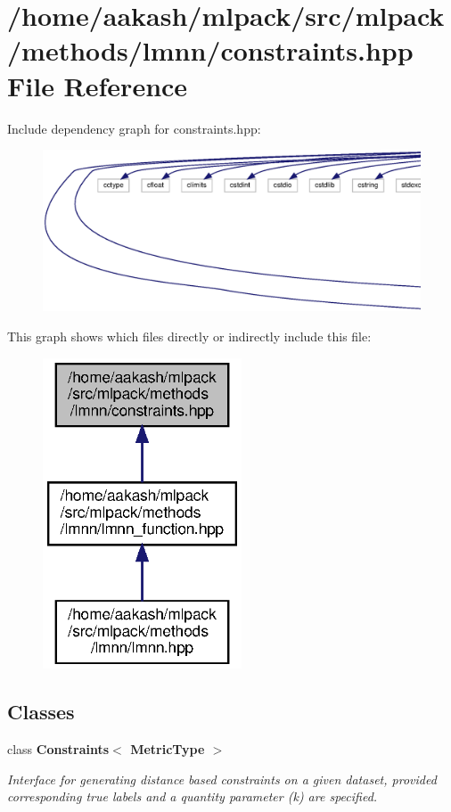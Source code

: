 \section{/home/aakash/mlpack/src/mlpack/methods/lmnn/constraints.hpp File Reference}
\label{constraints_8hpp}
Include dependency graph for constraints.\+hpp\+:
\nopagebreak
\begin{figure}[H]
\begin{center}
\leavevmode
\includegraphics[width=350pt]{constraints_8hpp__incl}
\end{center}
\end{figure}
This graph shows which files directly or indirectly include this file\+:
\nopagebreak
\begin{figure}[H]
\begin{center}
\leavevmode
\includegraphics[width=167pt]{constraints_8hpp__dep__incl}
\end{center}
\end{figure}
\subsection*{Classes}
\begin{DoxyCompactItemize}
\item 
class \textbf{ Constraints$<$ Metric\+Type $>$}
\begin{DoxyCompactList}\small\item\em Interface for generating distance based constraints on a given dataset, provided corresponding true labels and a quantity parameter (k) are specified. \end{DoxyCompactList}\end{DoxyCompactItemize}
